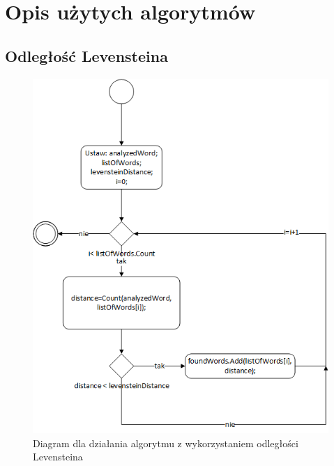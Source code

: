\chapter{Opis użytych algorytmów}

\section{Odległość Levensteina}

\begin{figure} [H]
	\centering
	\includegraphics[width=0.6\linewidth]{rozdzial02/Levenstein1.png}
	\caption{Diagram dla działania algorytmu z wykorzystaniem odległości Levensteina}
	\label{fig:Lev}
\end{figure}

